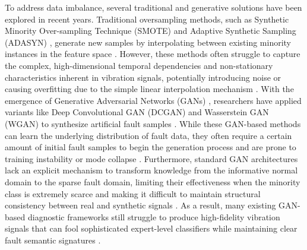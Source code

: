 To address data imbalance, several traditional and generative solutions have been explored in recent years. Traditional oversampling methods, such as Synthetic Minority Over-sampling Technique (SMOTE) \cite{chawla2002smote} and Adaptive Synthetic Sampling (ADASYN) \cite{he2008adasyn}, generate new samples by interpolating between existing minority instances in the feature space \cite{zhao2022cnn_smote_bearing, chawla2002smote, he2008adasyn}. However, these methods often struggle to capture the complex, high-dimensional temporal dependencies and non-stationary characteristics inherent in vibration signals, potentially introducing noise or causing overfitting due to the simple linear interpolation mechanism \cite{liu2020gan_smote_fault, zhao2022cnn_smote_bearing, liu2020gan_smote_fault}. With the emergence of Generative Adversarial Networks (GANs) \cite{goodfellow2014gan}, researchers have applied variants like Deep Convolutional GAN (DCGAN) \cite{radford2015dcgan} and Wasserstein GAN (WGAN) \cite{arjovsky2017wgan} to synthesize artificial fault samples \cite{li2021wgan_gp_fault, li2022multi_mode_acgan, radford2015dcgan, arjovsky2017wgan}. While these GAN-based methods can learn the underlying distribution of fault data, they often require a certain amount of initial fault samples to begin the generation process and are prone to training instability or mode collapse \cite{gulrajani2017wgangp, meng2022iacgan, gulrajani2017wgangp, meng2022iacgan}. Furthermore, standard GAN architectures lack an explicit mechanism to transform knowledge from the informative normal domain to the sparse fault domain, limiting their effectiveness when the minority class is extremely scarce and making it difficult to maintain structural consistency between real and synthetic signals \cite{zhu2017cyclegan, alotaibi2021cyclegan_signal, zhu2017cyclegan, alotaibi2021cyclegan_signal}. As a result, many existing GAN-based diagnostic frameworks still struggle to produce high-fidelity vibration signals that can fool sophisticated expert-level classifiers while maintaining clear fault semantic signatures \cite{meng2022iacgan, li2022multi_mode_acgan, shao2018acgan_1dcnn}.

